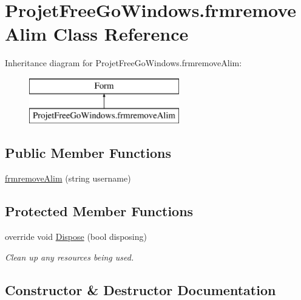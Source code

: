 \hypertarget{class_projet_free_go_windows_1_1frmremove_alim}{}\section{Projet\+Free\+Go\+Windows.\+frmremove\+Alim Class Reference}
\label{class_projet_free_go_windows_1_1frmremove_alim}
Inheritance diagram for Projet\+Free\+Go\+Windows.\+frmremove\+Alim\+:\begin{figure}[H]
\begin{center}
\leavevmode
\includegraphics[height=2.000000cm]{class_projet_free_go_windows_1_1frmremove_alim}
\end{center}
\end{figure}
\subsection*{Public Member Functions}
\begin{DoxyCompactItemize}
\item 
\hyperlink{class_projet_free_go_windows_1_1frmremove_alim_a36501b9b26c40d2f270c91705c90d064}{frmremove\+Alim} (string username)
\end{DoxyCompactItemize}
\subsection*{Protected Member Functions}
\begin{DoxyCompactItemize}
\item 
override void \hyperlink{class_projet_free_go_windows_1_1frmremove_alim_a9a7d2ae9551b3bc12df2f4b995006b39}{Dispose} (bool disposing)
\begin{DoxyCompactList}\small\item\em Clean up any resources being used. \end{DoxyCompactList}\end{DoxyCompactItemize}


\subsection{Constructor \& Destructor Documentation}
\mbox{\label{class_projet_free_go_windows_1_1frmremove_alim_a36501b9b26c40d2f270c91705c90d064}} 
